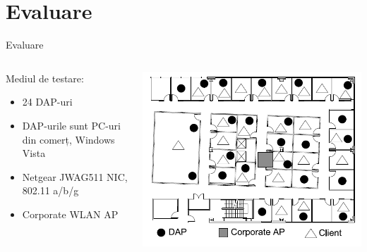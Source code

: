 \section{Evaluare}

\begin{frame}{Evaluare}
  \begin{columns}
  \begin{column}{0.5\linewidth}
    Mediul de testare:
    \begin{itemize}
      \item 24 DAP-uri
      \item DAP-urile sunt PC-uri din comerț, Windows Vista
      \item Netgear JWAG511 NIC, 802.11 a/b/g
      \item Corporate WLAN AP
    \end{itemize}
  \end{column}
  \begin{column}{0.5\linewidth}
    \includegraphics[scale=0.27]{img/fig6.png}
  \end{column}
  \end{columns}
\end{frame}

